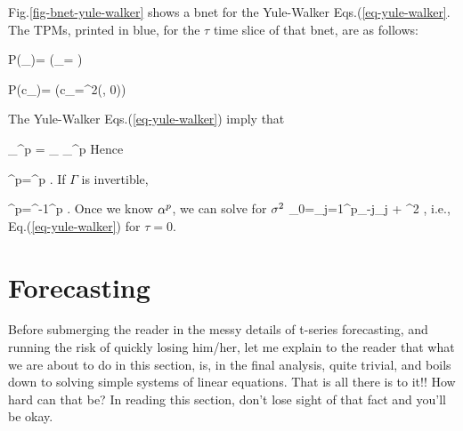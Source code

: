 Fig.\ref{fig-bnet-yule-walker}
shows a bnet
for the
Yule-Walker
Eqs.(\ref{eq-yule-walker}.
The TPMs,
printed in blue, for the
$\tau$ time slice of that
bnet, are
as follows:

\beq\color{blue}
P(\gamma_\tau)=
\indi\left(\gamma_\tau=
\right)
\eeq

\beq\color{blue}
P(c_\tau)=
\indi(c_\tau=\s^2\delta(\tau, 0))
\eeq


The Yule-Walker
Eqs.(\ref{eq-yule-walker})
imply that


\beq
{}_{\gamma^p}
=
_{\Gamma}
_{\alp^p}
\eeq
Hence

\beq
\gamma^p=\Gamma \alp^p
\;.
\eeq
If $\Gamma$
is invertible,

\beq
\alp^p=\Gamma^{-1}\gamma^p
\;.
\eeq
Once we know $\alpha^p$,
we can solve for $\sigma^2$
\beq
\gamma_0=\sum_{j=1}^p\gamma_{-j}\alp_j
+ \s^2
\;,
\eeq
i.e.,
Eq.(\ref{eq-yule-walker}) for $\tau=0$.



\section{Forecasting}




Before
submerging
the reader
in the messy details
of t-series forecasting,
and running
the risk of quickly losing him/her,
let me explain to the reader that
what we are about
to do in this section, is, in the final
analysis, quite trivial,
and boils down to
solving simple
systems
of linear equations.
That is all there is to it!!
How hard can that be?
In reading this section,
don't lose sight of that fact and
you'll be okay.

